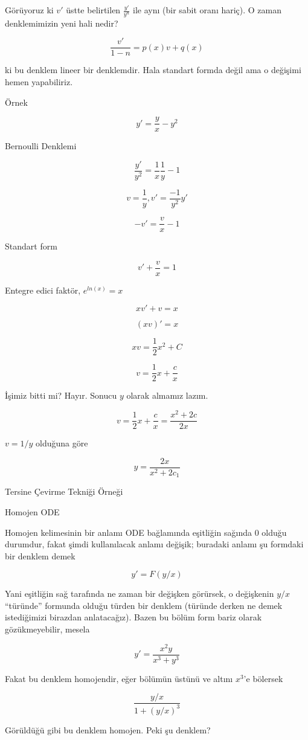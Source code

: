 \documentclass[12pt,fleqn]{article}\usepackage{../../common}
\begin{document}
Görüyoruz ki $v'$ üstte belirtilen $\frac{y'}{y^n}$ ile aynı (bir sabit
oranı hariç). O zaman denklemimizin yeni hali nedir?

$$ \frac{v'}{1-n} = p(x)v + q(x) $$

ki bu denklem lineer bir denklemdir. Hala standart formda değil ama o
değişimi hemen yapabiliriz.

Örnek

$$ y' = \frac{y}{x} - y^2 $$

Bernoulli Denklemi 

$$ \frac{y'}{y^2} = \frac{1}{x}\frac{1}{y} - 1 $$

$$ v = \frac{1}{y}, v' = \frac{-1}{y^2}y' $$

$$ -v' = \frac{v}{x} - 1 $$

Standart form

$$ v' + \frac{v}{x} = 1 $$

Entegre edici faktör, $e^{ln(x)} = x$

$$ xv' + v = x $$

$$ (xv)' = x $$

$$ xv = \frac{1}{2}x^2 + C $$

$$ v = \frac{1}{2}x + \frac{c}{x} $$

İşimiz bitti mi? Hayır. Sonucu $y$ olarak almamız lazım.

$$ v = \frac{1}{2}x + \frac{c}{x} = \frac{x^2+2c}{2x}$$

$v = 1/y$ olduğuna göre

$$ y = \frac{2x}{x^2+2c_1}$$

Tersine Çevirme Tekniği Örneği

Homojen ODE

Homojen kelimesinin bir anlamı ODE bağlamında eşitliğin sağında 0 olduğu
durumdur, fakat şimdi kullanılacak anlamı değişik; buradaki anlamı şu
formdaki bir denklem demek

$$ y' = F(y/x) $$

Yani eşitliğin sağ tarafında ne zaman bir değişken görürsek, o değişkenin
$y/x$ ``türünde'' formunda olduğu türden bir denklem (türünde derken ne
demek istediğimizi birazdan anlatacağız). Bazen bu bölüm form bariz olarak
gözükmeyebilir, mesela

$$ y' = \frac{x^2y}{x^3 + y^3} $$

Fakat bu denklem homojendir, eğer bölümün üstünü ve altını $x^3$'e bölersek

$$ \frac{y/x}{1+(y/x)^3} $$

Görüldüğü gibi bu denklem homojen. Peki şu denklem?
\end{document}
